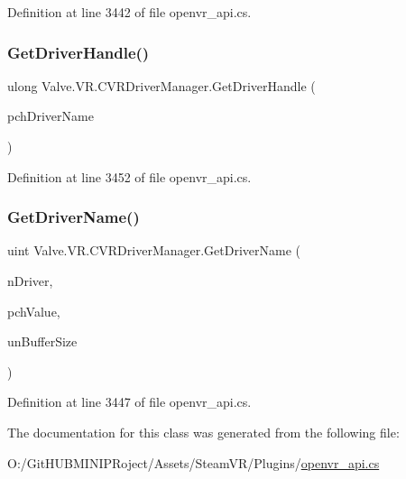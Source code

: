 Definition at line 3442 of file openvr\+\_\+api.\+cs.

\mbox{\label{class_valve_1_1_v_r_1_1_c_v_r_driver_manager_a5cfb39c1e3ec13c84ea41eae3c85d73a}} 
\subsubsection{\texorpdfstring{GetDriverHandle()}{GetDriverHandle()}}
{\footnotesize\ttfamily ulong Valve.\+V\+R.\+C\+V\+R\+Driver\+Manager.\+Get\+Driver\+Handle (\begin{DoxyParamCaption}\item[{string}]{pch\+Driver\+Name }\end{DoxyParamCaption})}



Definition at line 3452 of file openvr\+\_\+api.\+cs.

\mbox{\label{class_valve_1_1_v_r_1_1_c_v_r_driver_manager_ab33e5900d764b45519311eb5891b9316}} 
\subsubsection{\texorpdfstring{GetDriverName()}{GetDriverName()}}
{\footnotesize\ttfamily uint Valve.\+V\+R.\+C\+V\+R\+Driver\+Manager.\+Get\+Driver\+Name (\begin{DoxyParamCaption}\item[{uint}]{n\+Driver,  }\item[{System.\+Text.\+String\+Builder}]{pch\+Value,  }\item[{uint}]{un\+Buffer\+Size }\end{DoxyParamCaption})}



Definition at line 3447 of file openvr\+\_\+api.\+cs.



The documentation for this class was generated from the following file\+:\begin{DoxyCompactItemize}
\item 
O\+:/\+Git\+H\+U\+B\+M\+I\+N\+I\+P\+Roject/\+Assets/\+Steam\+V\+R/\+Plugins/\mbox{\hyperlink{openvr__api_8cs}{openvr\+\_\+api.\+cs}}\end{DoxyCompactItemize}

